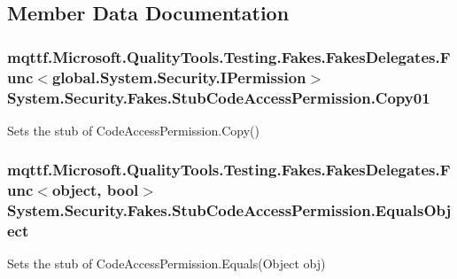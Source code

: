 \subsection{Member Data Documentation}
\hypertarget{class_system_1_1_security_1_1_fakes_1_1_stub_code_access_permission_a4d65296f72f8f0349d24adab05642df6}{
\subsubsection[{Copy01}]{\setlength{\rightskip}{0pt plus 5cm}mqttf.\-Microsoft.\-Quality\-Tools.\-Testing.\-Fakes.\-Fakes\-Delegates.\-Func$<$global.\-System.\-Security.\-I\-Permission$>$ System.\-Security.\-Fakes.\-Stub\-Code\-Access\-Permission.\-Copy01}}\label{class_system_1_1_security_1_1_fakes_1_1_stub_code_access_permission_a4d65296f72f8f0349d24adab05642df6}


Sets the stub of Code\-Access\-Permission.\-Copy()

\hypertarget{class_system_1_1_security_1_1_fakes_1_1_stub_code_access_permission_ac827fdc5fbf4494419b2a39a3419cabe}{
\subsubsection[{Equals\-Object}]{\setlength{\rightskip}{0pt plus 5cm}mqttf.\-Microsoft.\-Quality\-Tools.\-Testing.\-Fakes.\-Fakes\-Delegates.\-Func$<$object, bool$>$ System.\-Security.\-Fakes.\-Stub\-Code\-Access\-Permission.\-Equals\-Object}}\label{class_system_1_1_security_1_1_fakes_1_1_stub_code_access_permission_ac827fdc5fbf4494419b2a39a3419cabe}


Sets the stub of Code\-Access\-Permission.\-Equals(\-Object obj)

